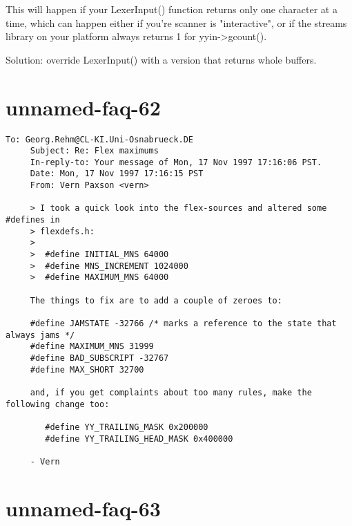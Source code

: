\documentclass[openany,oneside]{book}
\begin{document}
This will happen if your LexerInput() function returns only one character
at a time, which can happen either if you're scanner is "interactive", or
if the streams library on your platform always returns 1 for yyin->gcount().

Solution: override LexerInput() with a version that returns whole buffers.
\section{unnamed-faq-62}

\begin{verbatim}
To: Georg.Rehm@CL-KI.Uni-Osnabrueck.DE
     Subject: Re: Flex maximums
     In-reply-to: Your message of Mon, 17 Nov 1997 17:16:06 PST.
     Date: Mon, 17 Nov 1997 17:16:15 PST
     From: Vern Paxson <vern>
     
     > I took a quick look into the flex-sources and altered some #defines in
     > flexdefs.h:
     >
     > 	#define INITIAL_MNS 64000
     > 	#define MNS_INCREMENT 1024000
     > 	#define MAXIMUM_MNS 64000
     
     The things to fix are to add a couple of zeroes to:
     
     #define JAMSTATE -32766 /* marks a reference to the state that always jams */
     #define MAXIMUM_MNS 31999
     #define BAD_SUBSCRIPT -32767
     #define MAX_SHORT 32700
     
     and, if you get complaints about too many rules, make the following change too:
     
     	#define YY_TRAILING_MASK 0x200000
     	#define YY_TRAILING_HEAD_MASK 0x400000
     
     - Vern
\end{verbatim}

\section{unnamed-faq-63}
\end{document}
